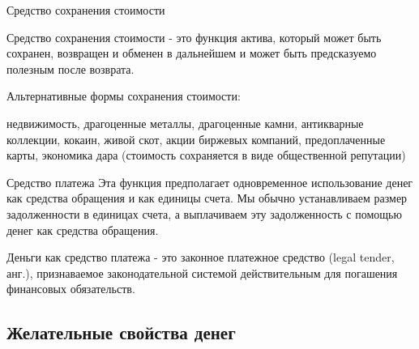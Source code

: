 \documentclass[_DKB_p1_Money.tex]{subfiles}
\begin{document}
\begin{frame}{Средство сохранения стоимости   }
\begin{block}{Средство сохранения стоимости}
\quad
- это функция актива, который может быть сохранен, возвращен и обменен в дальнейшем и может быть предсказуемо полезным после возврата.
\end{block}
Альтернативные формы сохранения стоимости:

недвижимость, драгоценные металлы, драгоценные камни, антикварные коллекции, кокаин, живой скот, акции биржевых компаний, предоплаченные карты, экономика дара (стоимость сохраняется в виде общественной репутации)
\end{frame}

\begin{frame}{Средство платежа }
Эта функция предполагает одновременное использование денег как средства обращения и как единицы счета. Мы обычно устанавливаем размер задолженности в единицах счета, а выплачиваем эту задолженность с помощью денег как средства обращения. 
\begin{block}{Деньги как средство платежа}
\quad
- это законное платежное средство (legal tender, анг.), признаваемое законодательной системой действительным для погашения финансовых обязательств.
\end{block}
\end{frame}

\subsection{Желательные свойства денег}
\begin{frame}{}
\begin{figure}
	\centering
	\begin{overprint}
	\end{overprint}
	\vspace*{-1.5em}
	\caption{}
\end{figure}
\end{frame}

\end{document}
